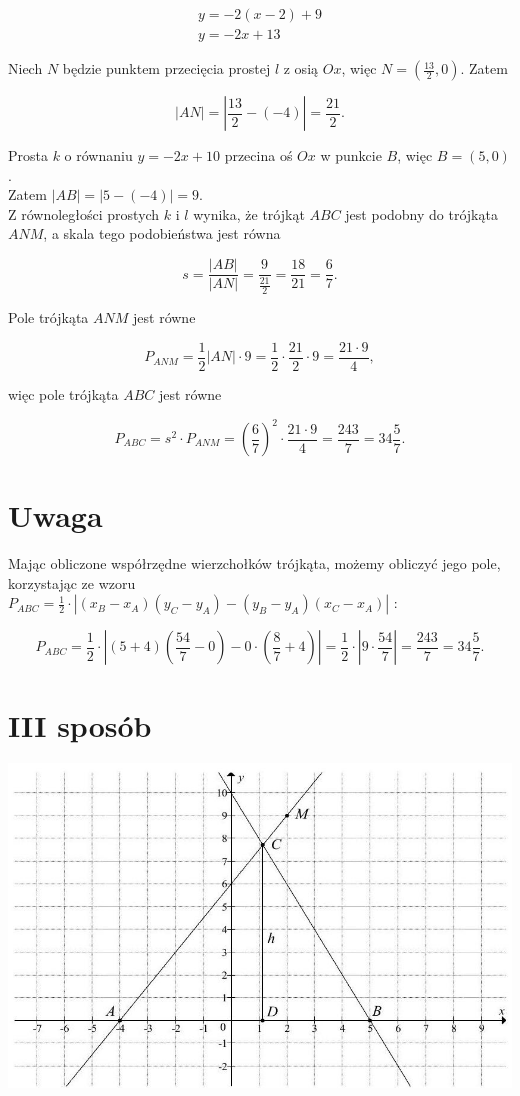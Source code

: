 \documentclass[10pt]{article}
\begin{document}
$$
\begin{gathered}
y=-2(x-2)+9 \\
y=-2 x+13
\end{gathered}
$$

Niech $N$ będzie punktem przecięcia prostej $l$ z osią $O x$, więc $N=\left(\frac{13}{2}, 0\right)$. Zatem

$$
|A N|=\left|\frac{13}{2}-(-4)\right|=\frac{21}{2} .
$$

Prosta $k$ o równaniu $y=-2 x+10$ przecina oś $O x$ w punkcie $B$, więc $B=(5,0)$.\\
Zatem $|A B|=|5-(-4)|=9$.\\
Z równoległości prostych $k$ i $l$ wynika, że trójkąt $A B C$ jest podobny do trójkąta $A N M$, a skala tego podobieństwa jest równa

$$
s=\frac{|A B|}{|A N|}=\frac{9}{\frac{21}{2}}=\frac{18}{21}=\frac{6}{7} .
$$

Pole trójkąta $A N M$ jest równe

$$
P_{A N M}=\frac{1}{2}|A N| \cdot 9=\frac{1}{2} \cdot \frac{21}{2} \cdot 9=\frac{21 \cdot 9}{4},
$$

więc pole trójkąta $A B C$ jest równe

$$
P_{A B C}=s^{2} \cdot P_{A N M}=\left(\frac{6}{7}\right)^{2} \cdot \frac{21 \cdot 9}{4}=\frac{243}{7}=34 \frac{5}{7} .
$$

\section*{Uwaga}
Mając obliczone współrzędne wierzchołków trójkąta, możemy obliczyć jego pole, korzystając ze wzoru $P_{A B C}=\frac{1}{2} \cdot\left|\left(x_{B}-x_{A}\right)\left(y_{C}-y_{A}\right)-\left(y_{B}-y_{A}\right)\left(x_{C}-x_{A}\right)\right|$ :

$$
P_{A B C}=\frac{1}{2} \cdot\left|(5+4)\left(\frac{54}{7}-0\right)-0 \cdot\left(\frac{8}{7}+4\right)\right|=\frac{1}{2} \cdot\left|9 \cdot \frac{54}{7}\right|=\frac{243}{7}=34 \frac{5}{7} .
$$

\section*{III sposób}
\begin{center}
\includegraphics[max width=\textwidth]{2025_02_07_e35f706dbfcfb4be75cfg-19}
\end{center}
\end{document}
